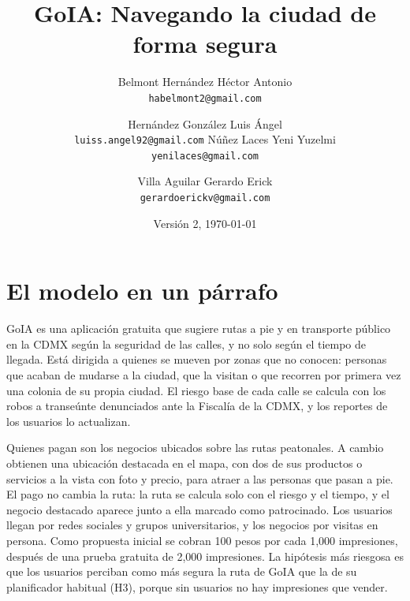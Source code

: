 \documentclass[11pt]{article}
\title{GoIA: Navegando la ciudad de forma segura}
\author{%
  Belmont Hernández Héctor Antonio\\ {\small\texttt{habelmont2@gmail.com}}
  \and
  Hernández González Luis Ángel\\ {\small\texttt{luiss.angel92@gmail.com}}
  \otrorenglon
  Núñez Laces Yeni Yuzelmi\\ {\small\texttt{yenilaces@gmail.com}}
  \and
  Villa Aguilar Gerardo Erick\\ {\small\texttt{gerardoerickv@gmail.com}}
}
\date{Versión 2, \today}
\begin{document}
\maketitle
\thispagestyle{empty}

\section{El modelo en un párrafo}
\label{sec:resumen}

GoIA es una aplicación gratuita que sugiere rutas a pie y en transporte público en la CDMX según
la seguridad de las calles, y no solo según el tiempo de llegada. Está dirigida a quienes se
mueven por zonas que no conocen: personas que acaban de mudarse a la ciudad, que la visitan o que
recorren por primera vez una colonia de su propia ciudad. El riesgo base de cada calle se calcula
con los robos a transeúnte denunciados ante la Fiscalía de la CDMX, y los reportes de los usuarios
lo actualizan.

Quienes pagan son los negocios ubicados sobre las rutas peatonales. A cambio obtienen una
ubicación destacada en el mapa, con dos de sus productos o servicios a la vista con foto y precio,
para atraer a las personas que pasan a pie. El pago no cambia la ruta: la ruta se calcula solo con
el riesgo y el tiempo, y el negocio destacado aparece junto a ella marcado como patrocinado.
Los usuarios llegan por redes sociales y grupos universitarios, y los negocios por visitas en
persona. Como propuesta inicial se cobran 100 pesos por cada 1,000 impresiones, después de una
prueba gratuita de 2,000 impresiones. La hipótesis más riesgosa es que los usuarios perciban como
más segura la ruta de GoIA que la de su planificador habitual (H3), porque sin usuarios no hay
impresiones que vender.


\end{document}
